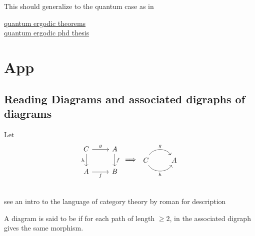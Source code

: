 \documentclass{book}
\begin{document}
\begin{ex}
		This should generalize to the quantum case as in 
		
		\href{http://math.ucv.ro/~niculescu/articles/before2000/Hilbert%20Revue%201999.pdf}{quantum ergodic theorems}\\
		\href{https://arxiv.org/pdf/quant-ph/0312051}{quantum ergodic phd thesis}
	\end{ex}
	
	
	
	
	
	
	
	
	
	
	
	
	
	
	
	
	
	
	
	
	
	
	
	
	\appendix
	\chapter{App}
	
	\section{Reading Diagrams and associated digraphs of diagrams}
	
	\begin{defn}
		Let 
		\[ 
		\begin{tikzcd}[baseline= 7]
			C \arrow[r, "g"] \arrow[d, "h"'] & A \arrow[d, "f"] \\
			A \arrow[r, "f"'] & B\\
		\end{tikzcd}
		\implies
		\begin{tikzcd}[baseline= 7]
			C \arrow[bend right=60, swap]{r}{h} \arrow[bend right=-60]{r}{g} & A  \\
		\end{tikzcd}
		\]
		
		see an intro to the language of category theory by roman for description
	\end{defn}
	
	
	\begin{defn}
		A diagram is said to be  if for each path of length $\geq 2$, in the associated digraph gives the same morphism.  
	\end{defn}
	
	
	
	\backmatter
	
	
	
	
	
	
	
	
	
	
	
	
	
	
\end{document}
